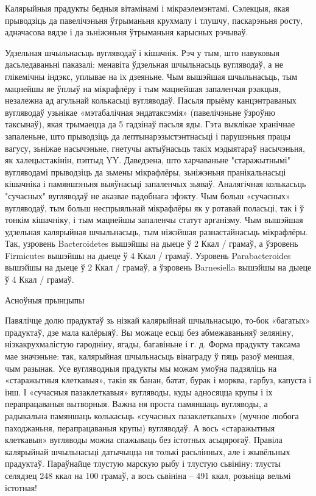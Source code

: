 Калярыйныя прадукты бедныя вітамінамі і мікраэлемэнтамі. Сэлекцыя, якая прыводзіць да павелічэньня ўтрыманьня крухмалу і тлушчу, паскарэньня росту, адначасова вядзе і да зьніжэньня ўтрыманьня карысных рэчываў.

Удзельная шчыльнасьць вугляводаў і кішачнік.
Рэч у тым, што навуковыя дасьледаваньні паказалі: менавіта ўдзельная шчыльнасьць вугляводаў, а не глікемічны індэкс, уплывае на іх дзеяньне. Чым вышэйшая шчыльнасьць, тым мацнейшы яе ўплыў на мікрафлёру і тым мацнейшая запаленчая рэакцыя, незалежна ад агульнай колькасьці вугляводаў. Пасьля прыёму канцэнтраваных вугляводаў узьнікае «мэтабалічная эндатаксэмія» (павелічэньне ўзроўню таксынаў), якая трымаецца да 5 гадзінаў пасьля яды. Гэта выклікае хранічнае запаленьне, што прыводзіць да лептынарэзыстэнтнасьці і парушэньня працы вагусу, зьніжае насычэньне, гнетучы актыўнасьць такіх мэдыятараў насычэньня, як халецыстакінін, пэптыд YY. Даведзена, што харчаваньне "старажытнымі" вугляводамі прыводзіць да зьмены мікрафлёры, зьніжэньня пранікальнасьці кішачніка і памяншэньня выяўнасьці запаленчых зьяваў. Аналягічная колькасьць "сучасных" вугляводаў не аказвае падобнага эфэкту. Чым больш «сучасных» вугляводаў, тым больш неспрыяльнай мікрафлёры як у ротавай поласьці, так і ў тонкім кішачніку, і тым мацнейшы запаленчы статут арганізму.
Чым вышэйшая удзельная калярыйная шчыльнасьць, тым ніжэйшая разнастайнасьць мікрафлёры. Так, узровень Bacteroidetes вышэйшы на дыеце ў 2 Ккал / грамаў, а ўзровень Firmicutes вышэйшы на дыеце ў 4 Ккал / грамаў. Узровень Parabacteroides вышэйшы на дыеце ў 2 Ккал / грамаў, а ўзровень Barnesiella вышэйшы на дыеце ў 4 Ккал / грамаў.

Асноўныя прынцыпы

Павялічце долю прадуктаў зь нізкай калярыйнай шчыльнасьцю, то-бок «багатых» прадуктаў, дзе мала калёрыяў. Вы можаце есьці без абмежаваньняў зеляніну, нізкакрухмалістую гародніну, ягады, багавіньне і г. д. Форма прадукту таксама мае значэньне: так, калярыйная шчыльнасьць вінаграду ў пяць разоў меншая, чым разынак. Усе вугляводныя прадукты мы можам умоўна падзяліць на «старажытныя клеткавыя», такія як банан, батат, бурак і морква, гарбуз, капуста і інш. І «сучасныя пазаклеткавыя» вугляводы, куды адносяцца крупы і іх перапрацаваныя вытворныя. Важна ня проста памяншаць вугляводы, а радыкальна памяншаць колькасьць «сучасных пазаклеткавых» (мучное любога паходжаньня, перапрацаваныя крупы) вугляводаў. А вось «старажытныя клеткавыя» вугляводы можна спажываць без істотных асьцярогаў. Правіла калярыйнай шчыльнасьці датычыцца ня толькі расьлінных, але і жывёльных прадуктаў. Параўнайце тлустую марскую рыбу і тлустую сьвініну: тлусты селядзец 248 ккал на 100 грамаў, а вось сьвініна – 491 ккал, розьніца вельмі істотная!

